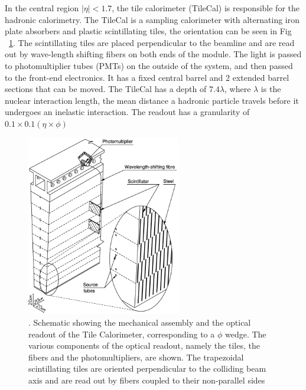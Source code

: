 \indent In the central region ${|\eta{}|<1.7}$, the tile calorimeter (TileCal) is responsible for the hadronic calorimetry. The TileCal is a sampling calorimeter with alternating iron plate absorbers and plastic scintillating tiles, the orientation can be seen in Fig ~\ref{fig:tile}. The scintillating tiles are placed perpendicular to the beamline and are read out by wave-length shifting fibers on both ends of the module. The light is passed to photomultiplier tubes (PMTs) on the outside of the system, and then passed to the front-end electronics. It has a fixed central barrel and 2 extended barrel sections that can be moved. The TileCal has a depth of ${7.4\lambda{}}$, where ${\lambda{}}$ is the nuclear interaction length, the mean distance a hadronic particle travels before it undergoes an inelastic interaction. The readout has a granularity of ${0.1\times0.1(\eta\times\phi)}$

\begin{figure}[h]
\begin{center}
\includegraphics*[width=0.60\textwidth] {figures/Schematic-showing-the-mechanical-assembly-and-the-optical-readout-of-the-Tile}%
\caption[tile readout]{. Schematic showing the mechanical assembly and the optical readout of
the Tile Calorimeter, corresponding to a ${\phi}$ wedge. The various components of
the optical readout, namely the tiles, the fibers and the photomultipliers, are
shown. The trapezoidal scintillating tiles are oriented perpendicular to the
colliding beam axis and are read out by fibers coupled to their non-parallel
sides \cite{HenriquesCorreia:2004868}}
\label{fig:tile}
\end{center}
\end{figure}



